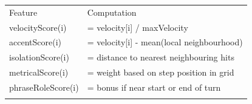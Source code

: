 {\def\LTcaptype{none} %
\begin{longtable}[]{@{}
  >{\raggedright\arraybackslash}p{}
  >{\raggedright\arraybackslash}p{}@{}}
\toprule\noalign{}
\begin{minipage}[b]{\linewidth}\centering
Feature
\end{minipage} & \begin{minipage}[b]{\linewidth}\centering
Computation
\end{minipage} \\
\begin{minipage}[b]{\linewidth}\raggedright
velocityScore(i)
\end{minipage} & \begin{minipage}[b]{\linewidth}\raggedright
= velocity{[}i{]} / maxVelocity
\end{minipage} \\
\begin{minipage}[b]{\linewidth}\raggedright
accentScore(i)
\end{minipage} & \begin{minipage}[b]{\linewidth}\raggedright
= velocity{[}i{]} - mean(local neighbourhood)
\end{minipage} \\
\begin{minipage}[b]{\linewidth}\raggedright
isolationScore(i)
\end{minipage} & \begin{minipage}[b]{\linewidth}\raggedright
= distance to nearest neighbouring hits
\end{minipage} \\
\begin{minipage}[b]{\linewidth}\raggedright
metricalScore(i)
\end{minipage} & \begin{minipage}[b]{\linewidth}\raggedright
= weight based on step position in grid
\end{minipage} \\
\begin{minipage}[b]{\linewidth}\raggedright
phraseRoleScore(i)
\end{minipage} & \begin{minipage}[b]{\linewidth}\raggedright
= bonus if near start or end of turn
\end{minipage} \\
\midrule\noalign{}
\endhead
\bottomrule\noalign{}
\endlastfoot
\end{longtable}
}

